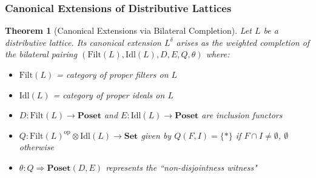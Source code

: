 \documentclass[11pt]{article}
\theoremstyle{plain}
\newtheorem{theorem}{Theorem}[section]
\theoremstyle{definition}
\theoremstyle{remark}
\newcommand{\op}{\mathrm{op}}
\begin{document}
\subsubsection{Canonical Extensions of Distributive Lattices}

\begin{theorem}[Canonical Extensions via Bilateral Completion]\label{thm:canonical-extension-bilateral}
Let $L$ be a distributive lattice. Its canonical extension $L^{\delta}$ arises as the weighted completion of the bilateral pairing $(\mathrm{Filt}(L), \mathrm{Idl}(L), D, E, Q, \theta)$ where:
\begin{itemize}
\item $\mathrm{Filt}(L)$ = category of proper filters on $L$
\item $\mathrm{Idl}(L)$ = category of proper ideals on $L$  
\item $D : \mathrm{Filt}(L) \to \mathbf{Poset}$ and $E : \mathrm{Idl}(L) \to \mathbf{Poset}$ are inclusion functors
\item $Q : \mathrm{Filt}(L)^{\op} \otimes \mathrm{Idl}(L) \to \mathbf{Set}$ given by $Q(F, I) = \{*\}$ if $F \cap I \neq \emptyset$, $\emptyset$ otherwise
\item $\theta : Q \Rightarrow \mathbf{Poset}(D, E)$ represents the ``non-disjointness witness"
\end{itemize}
\end{theorem}
\end{document}
